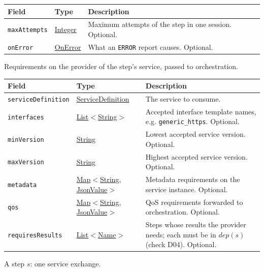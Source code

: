\documentclass[a4paper]{arrowhead}
\newcommand{\mref}[1]{{\textcolor{ArrowheadPurple}{\hyperref[sec:model:#1]{#1}}}}
\newcommand{\pref}[1]{{\textcolor{ArrowheadGrey}{\hyperref[sec:model:primitives:#1]{#1}}}}
\begin{document}
{\small
\begin{longtable}{|p{3.9cm}|p{4.4cm}|p{7.5cm}|}

\hline
\rowcolor{gray!33} Field & Type & Description \\ \hline
\endhead
\texttt{maxAttempts} & \pref{Integer} & Maximum attempts of the step in one session. Optional. \\ \hline
\texttt{onError} & \mref{OnError} & What an \texttt{ERROR} report causes. Optional. \\ \hline
\end{longtable}
}

Requirements on the provider of the step's service, passed to orchestration.

{\small
\begin{longtable}{|p{3.9cm}|p{4.4cm}|p{7.5cm}|}

\hline
\rowcolor{gray!33} Field & Type & Description \\ \hline
\endhead
\texttt{serviceDefinition} & \pref{ServiceDefinition} & The service to consume. \\ \hline
\texttt{interfaces} & \pref{List}$<$\pref{String}$>$ & Accepted interface template names, e.g. \texttt{generic\_https}. Optional. \\ \hline
\texttt{minVersion} & \pref{String} & Lowest accepted service version. Optional. \\ \hline
\texttt{maxVersion} & \pref{String} & Highest accepted service version. Optional. \\ \hline
\texttt{metadata} & \pref{Map}$<$\pref{String}, \pref{JsonValue}$>$ & Metadata requirements on the service instance. Optional. \\ \hline
\texttt{qos} & \pref{Map}$<$\pref{String}, \pref{JsonValue}$>$ & QoS requirements forwarded to orchestration. Optional. \\ \hline
\texttt{requiresResults} & \pref{List}$<$\pref{Name}$>$ & Steps whose results the provider needs; each must be in $dep(s)$ (check D04). Optional. \\ \hline
\end{longtable}
}

A step $s$: one service exchange.
\end{document}
